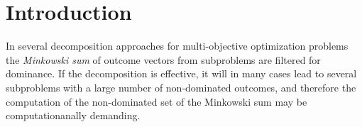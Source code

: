 \section{Introduction}

In several decomposition approaches for multi-objective optimization problems the \emph{Minkowski sum} of outcome vectors from subproblems are filtered for dominance. If the decomposition is effective, it will in many cases lead to several subproblems with a large number of non-dominated outcomes, and therefore the computation of the non-dominated set of the Minkowski sum may be computationanally demanding. 